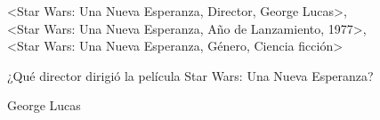 \begin{tcolorbox}[colback=white,colframe=black!50!white,title=Input]
<Star Wars: Una Nueva Esperanza, Director, George Lucas>, \\
<Star Wars: Una Nueva Esperanza, Año de Lanzamiento, 1977>, \\
<Star Wars: Una Nueva Esperanza, Género, Ciencia ficción>
\end{tcolorbox}
\begin{tcolorbox}[colback=white,colframe=black!50!white,title=Pregunta]
¿Qué director dirigió la película Star Wars: Una Nueva Esperanza?
\end{tcolorbox}
\begin{tcolorbox}[colback=white,colframe=black!50!white,title=Respuesta esperada]
George Lucas
\end{tcolorbox}

\newpage
